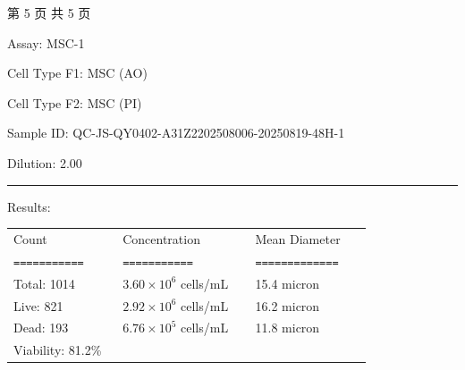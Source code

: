 \documentclass[UTF8,10pt,a4paper,fontset=fandol]{ctexart}
\newcommand{\fieldvalue}[1]{#1}
\begin{document}
\begin{center}
\scriptsize 第 5 页 共 5 页
\end{center}

\newpage

\noindent Assay: 
\fieldvalue{MSC-1}

\vspace{0.5em}

\noindent Cell Type F1: 
\fieldvalue{MSC (AO)}

\noindent Cell Type F2: 
\fieldvalue{MSC (PI)}

\vspace{0.5em}

\noindent Sample ID: 
\fieldvalue{QC-JS-QY0402-A31Z2202508006-20250819-48H-1}

\noindent Dilution: 
\fieldvalue{2.00}

\vspace{0.5em}
\noindent\rule{\linewidth}{0.4pt}

\noindent Results:

\vspace{0.5em}

\begin{tabular}{@{}p{0.28\linewidth}p{0.34\linewidth}p{0.30\linewidth}@{}}
Count & Concentration & Mean Diameter \\
\texttt{===========} & \texttt{===========} & \texttt{=============} \\[0.2em]
Total:
\fieldvalue{1014}
&
\fieldvalue{$3.60\times10^{6}$ cells/mL}
&
\fieldvalue{15.4 micron}
\\
Live:
\fieldvalue{821}
&
\fieldvalue{$2.92\times10^{6}$ cells/mL}
&
\fieldvalue{16.2 micron}
\\
Dead:
\fieldvalue{193}
&
\fieldvalue{$6.76\times10^{5}$ cells/mL}
&
\fieldvalue{11.8 micron}
\\
Viability:
\fieldvalue{81.2\%}
&
&
\end{tabular}
\end{document}
